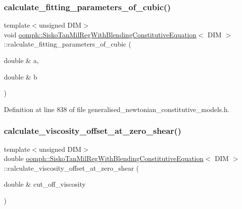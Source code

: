 \subsubsection{\texorpdfstring{calculate\+\_\+fitting\+\_\+parameters\+\_\+of\+\_\+cubic()}{calculate\_fitting\_parameters\_of\_cubic()}}
{\footnotesize\ttfamily template$<$unsigned D\+IM$>$ \\
void \hyperlink{classoomph_1_1SiskoTanMilRegWithBlendingConstitutiveEquation}{oomph\+::\+Sisko\+Tan\+Mil\+Reg\+With\+Blending\+Constitutive\+Equation}$<$ D\+IM $>$\+::calculate\+\_\+fitting\+\_\+parameters\+\_\+of\+\_\+cubic (\begin{DoxyParamCaption}\item[{double \&}]{a,  }\item[{double \&}]{b }\end{DoxyParamCaption})\hspace{0.3cm}{\ttfamily [inline]}}



Definition at line 838 of file generalised\+\_\+newtonian\+\_\+constitutive\+\_\+models.\+h.

\mbox{\label{classoomph_1_1SiskoTanMilRegWithBlendingConstitutiveEquation_a4aa9049f9acfd25208deb26d011350fc}} 
\subsubsection{\texorpdfstring{calculate\+\_\+viscosity\+\_\+offset\+\_\+at\+\_\+zero\+\_\+shear()}{calculate\_viscosity\_offset\_at\_zero\_shear()}}
{\footnotesize\ttfamily template$<$unsigned D\+IM$>$ \\
double \hyperlink{classoomph_1_1SiskoTanMilRegWithBlendingConstitutiveEquation}{oomph\+::\+Sisko\+Tan\+Mil\+Reg\+With\+Blending\+Constitutive\+Equation}$<$ D\+IM $>$\+::calculate\+\_\+viscosity\+\_\+offset\+\_\+at\+\_\+zero\+\_\+shear (\begin{DoxyParamCaption}\item[{double \&}]{cut\+\_\+off\+\_\+viscosity }\end{DoxyParamCaption})\hspace{0.3cm}{\ttfamily [inline]}}

